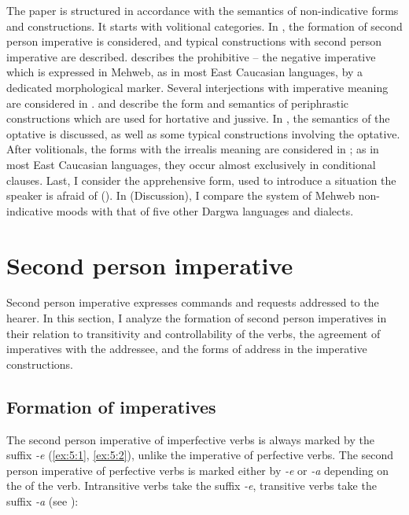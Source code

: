 ﻿\documentclass[output=paper]{langsci/langscibook}
\begin{document}
The paper is structured in accordance with the semantics of
non-indicative forms and constructions. It starts with volitional
categories. In , the formation of second person imperative is
considered, and typical constructions with second person imperative are
described.  describes the prohibitive – the negative
imperative which is expressed in Mehweb, as in most East Caucasian
languages, by a dedicated morphological marker. Several interjections
with imperative meaning are considered in .  and 
describe the form and semantics of periphrastic constructions which are
used for hortative and jussive. In , the semantics of the optative
is discussed, as well as some typical constructions involving the
optative. After volitionals, the forms with the irrealis meaning are
considered in ; as in most East Caucasian languages, they occur
almost exclusively in conditional clauses. Last, I consider the
apprehensive form, used to introduce a situation the speaker is afraid
of (). In  (Discussion), I compare the system of
Mehweb non-indicative moods with that of five other Dargwa languages and
dialects.

\section{Second person imperative}\label{second-person-imperative}

Second person imperative expresses commands and requests addressed to
the hearer. In this section, I analyze the formation of second person
imperatives in their relation to transitivity and controllability of the
verbs, the agreement of imperatives with the addressee, and the forms of
address in the imperative constructions.

\subsection{Formation of imperatives}\label{formation-of-imperatives}

The second person imperative of imperfective verbs is always marked by
the suffix \emph{-e} (\ref{ex:5:1}, \ref{ex:5:2}), unlike the imperative of perfective
verbs. The second person imperative of perfective verbs is marked either
by \emph{-e} or \emph{-a} depending on the  of the verb.
Intransitive verbs take the suffix \emph{-e}, transitive verbs take the
suffix \emph{-a} (see ):
\end{document}

